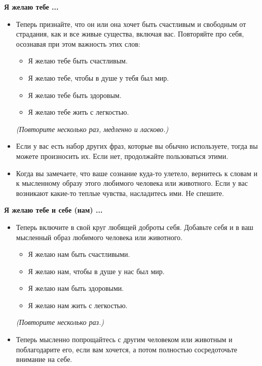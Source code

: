 {\large \textbf{Я желаю тебе ...}}
\begin{itemize}
	\item Теперь признайте, что он или она хочет быть счастливым и свободным от страдания, как и все живые существа, включая вас. Повторяйте про себя, осознавая при этом важность этих слов:
	\begin{itemize}
		\item Я желаю тебе быть счастливым.
		\item Я желаю тебе, чтобы в душе у тебя был мир.
		\item Я желаю тебе быть здоровым.
		\item Я желаю тебе жить с легкостью.
	\end{itemize}
	\emph{(Повторите несколько раз, медленно и ласково.)}
	\item Если у вас есть набор других фраз, которые вы обычно используете, тогда вы можете произносить их. Если нет, продолжайте пользоваться этими.
	\item Когда вы замечаете, что ваше сознание куда-то улетело, вернитесь к словам и к мысленному образу этого любимого человека или животного. Если у вас возникают какие-то теплые чувства, насладитесь ими. Не спешите.
\end{itemize}

\vspace{3ex}

{\large \textbf{Я желаю тебе и себе (нам) ...}}
\begin{itemize}
	\item Теперь включите в свой круг любящей доброты себя. Добавьте себя и в ваш мысленный образ любимого человека или животного.
	\begin{itemize}
		\item Я желаю нам быть счастливыми.
		\item Я желаю нам, чтобы в душе у нас был мир.
		\item Я желаю нам быть здоровыми.
		\item Я желаю нам жить с легкостью.
	\end{itemize}
	\emph{(Повторите несколько раз.)}
	\item Теперь мысленно попрощайтесь с другим человеком или животным и поблагодарите его, если вам хочется, а потом полностью сосредоточьте внимание на себе.
\end{itemize}

\vspace{3ex}

